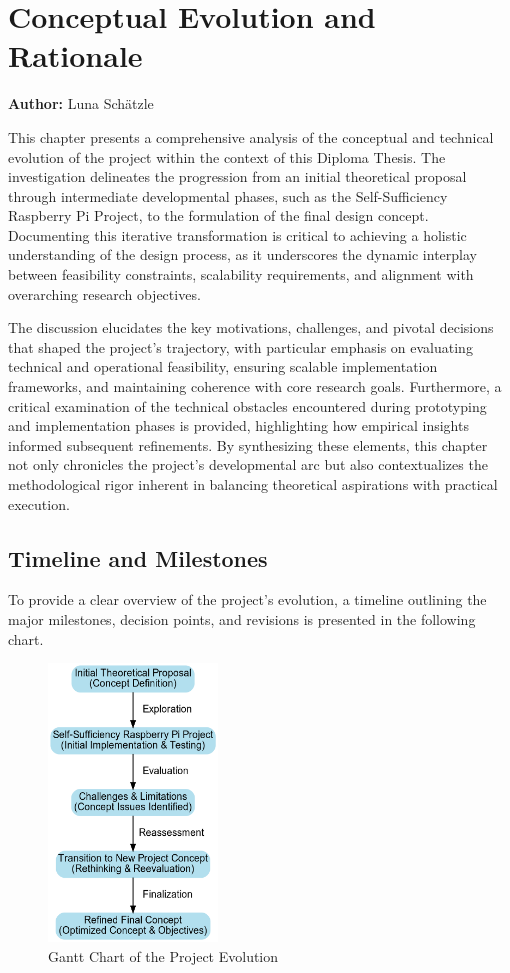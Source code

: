 \chapter{Conceptual Evolution and Rationale}
\label{chap:Conceptual_Evolution_and_Rationale}
\textbf{Author:} Luna Schätzle


This chapter presents a comprehensive analysis of the conceptual and technical evolution of the project within the context of this Diploma Thesis. The investigation delineates the progression from an initial theoretical proposal through intermediate developmental phases, such as the Self-Sufficiency Raspberry Pi Project, to the formulation of the final design concept. Documenting this iterative transformation is critical to achieving a holistic understanding of the design process, as it underscores the dynamic interplay between feasibility constraints, scalability requirements, and alignment with overarching research objectives.

The discussion elucidates the key motivations, challenges, and pivotal decisions that shaped the project’s trajectory, with particular emphasis on evaluating technical and operational feasibility, ensuring scalable implementation frameworks, and maintaining coherence with core research goals. Furthermore, a critical examination of the technical obstacles encountered during prototyping and implementation phases is provided, highlighting how empirical insights informed subsequent refinements. By synthesizing these elements, this chapter not only chronicles the project’s developmental arc but also contextualizes the methodological rigor inherent in balancing theoretical aspirations with practical execution.

\section{Timeline and Milestones}

To provide a clear overview of the project's evolution, a timeline outlining the major milestones, decision points, and revisions is presented in the following chart.
\begin{figure}[H]
    \centering
    \includegraphics[width=0.4\textwidth]{figures/concept_change_flowchart.png}
    \caption{Gantt Chart of the Project Evolution}
    \label{fig:GanttChart}
\end{figure}

